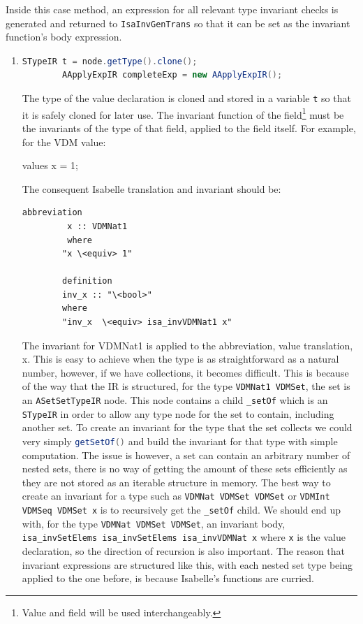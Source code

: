 	Inside this case method, an expression for all relevant type invariant checks is generated and returned to \lstinline[language=Java]{IsaInvGenTrans} so that it can be set as the invariant function's body expression. 
	\begin{enumerate}
		\item \begin{lstlisting}[language=Java]
		STypeIR t = node.getType().clone();
        AApplyExpIR completeExp = new AApplyExpIR();
		\end{lstlisting}
		The type of the value declaration is cloned and stored in a variable \lstinline[language=Java]{t} so that it is safely cloned for later use. The invariant function of the field\footnote{Value and field will be used interchangeably.} must be the invariants of the type of that field, applied to the field itself. For example, for the VDM value:
		\begin{vdmsl}
		values
		x = 1;
		\end{vdmsl}
		The consequent Isabelle translation and invariant should be:
		\begin{lstlisting}[language=Isabelle]
		abbreviation
		 x :: VDMNat1
		 where
		"x \<equiv> 1"

		definition
		inv_x :: "\<bool>"
	    where
	    "inv_x  \<equiv> isa_invVDMNat1 x"
		\end{lstlisting}
		The invariant for VDMNat1 is applied to the abbreviation, value translation, x. This is easy to achieve when the type is as straightforward as a natural number, however, if we have collections, it becomes difficult. This is because of the way that the IR is structured, for the type \lstinline[language=Java]{VDMNat1 VDMSet}, the set is an \lstinline[language=Java]{ASetSetTypeIR} node. This node contains a child \lstinline[language=Java]{_setOf} which is an \lstinline[language=Java]{STypeIR} in order to allow any type node for the set to contain, including another set. To create an invariant for the type that the set collects we could very simply \lstinline[language=Java]{getSetOf()} and build the invariant for that type with simple computation. The issue is however, a set can contain an arbitrary number of nested sets, there is no way of getting the amount of these sets efficiently as they are not stored as an iterable structure in memory. The best way to create an invariant for a type such as \lstinline[language=Java]{VDMNat VDMSet VDMSet} or \lstinline[language=Java]{VDMInt VDMSeq VDMSet x} is to recursively get the \lstinline[language=Java]{_setOf} child. We should end up with, for the type \lstinline[language=Java]{VDMNat VDMSet VDMSet}, an invariant body, \lstinline[language=Java]{isa_invSetElems isa_invSetElems isa_invVDMNat x} where \lstinline[language=Java]{x} is the value declaration, so the direction of recursion is also important. The reason that invariant expressions are structured like this, with each nested set type being applied to the one before, is because Isabelle's functions are curried.


\end{enumerate}
